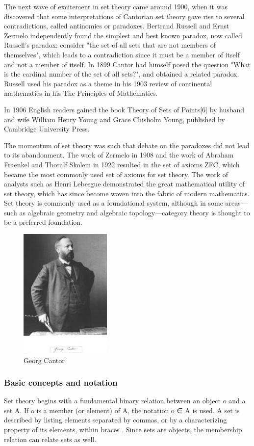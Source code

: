 \documentclass{article}
\begin{document}
The next wave of excitement in set theory came around 1900, when it was discovered that some interpretations of Cantorian set theory gave rise to several contradictions, called antinomies or paradoxes. Bertrand Russell and Ernst Zermelo independently found the simplest and best known paradox, now called Russell's paradox: consider "the set of all sets that are not members of themselves", which leads to a contradiction since it must be a member of itself and not a member of itself. In 1899 Cantor had himself posed the question "What is the cardinal number of the set of all sets?", and obtained a related paradox. Russell used his paradox as a theme in his 1903 review of continental mathematics in his The Principles of Mathematics.

In 1906 English readers gained the book Theory of Sets of Points[6] by husband and wife William Henry Young and Grace Chisholm Young, published by Cambridge University Press.

The momentum of set theory was such that debate on the paradoxes did not lead to its abandonment. The work of Zermelo in 1908 and the work of Abraham Fraenkel and Thoralf Skolem in 1922 resulted in the set of axioms ZFC, which became the most commonly used set of axioms for set theory. The work of analysts such as Henri Lebesgue demonstrated the great mathematical utility of set theory, which has since become woven into the fabric of modern mathematics. Set theory is commonly used as a foundational system, although in some areas—such as algebraic geometry and algebraic topology—category theory is thought to be a preferred foundation. 
\begin{figure}[h]
\includegraphics[width=0.4\textwidth]{sh.jpg}
\caption{Georg Cantor}
\end{figure}
\subsubsection{Basic concepts and notation}
Set theory begins with a fundamental binary relation between an object o and a set A. If o is a member (or element) of A, the notation o ∈ A is used. A set is described by listing elements separated by commas, or by a characterizing property of its elements, within braces { }. Since sets are objects, the membership relation can relate sets as well.
\end{document}

